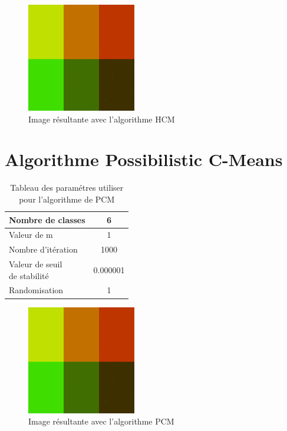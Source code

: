 \documentclass[a4paper,11pt]{article}
\begin{document}
\begin{figure}[H]
  \begin{center} 
    \includegraphics[width=180px]{../img/segHCM.png}
    \caption{Image résultante avec l'algorithme HCM}
  \end{center}
\end{figure}

\section{Algorithme Possibilistic C-Means}

\begin{table}[H]
  \begin{center}
    \begin{tabular}{|l|c|}
      \hline
      Nombre de classes & 6 \\
      \hline
      Valeur de m & 1 \\
      \hline
      Nombre d'itération & 1000 \\
      \hline
      \shortstack{ Valeur de seuil \\ de stabilité }  & 0.000001 \\
      \hline
      Randomisation & 1 \\
      \hline
    \end{tabular}
    \caption{Tableau des paramétres utiliser pour l'algorithme de PCM}
  \end{center}
\end{table}


\begin{figure}[H]
  \begin{center} 
    \includegraphics[width=180px]{../img/segHCM.png}
    \caption{Image résultante avec l'algorithme PCM}
  \end{center}
\end{figure}
\end{document}
